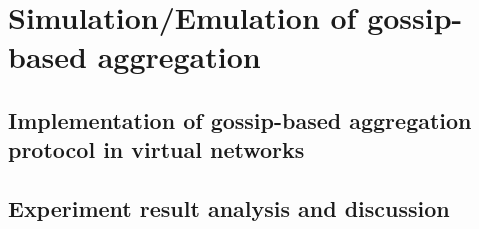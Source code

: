 \documentclass[11pt,a4paper]{article}
\begin{document}
\newpage

\section{Simulation/Emulation of gossip-based aggregation}

\subsection{Implementation of gossip-based aggregation protocol in virtual networks}

\subsection{Experiment result analysis and discussion}
\end{document}
